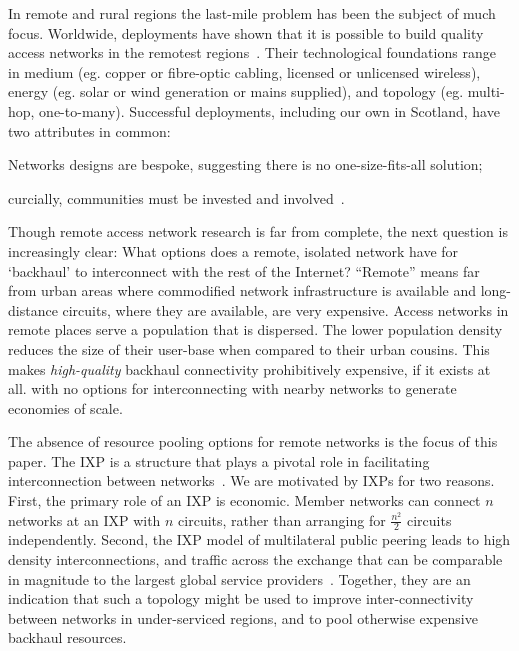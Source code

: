 In remote and rural regions the last-mile problem has been the subject of much
focus. Worldwide, deployments have shown that it is possible to build quality
access networks in the remotest regions~\cite{xxx}. Their technological
foundations range in medium (eg. copper or fibre-optic cabling, licensed
or unlicensed wireless), energy (eg. solar or wind generation or
mains supplied), and topology (eg. multi-hop,
one-to-many). Successful deployments, including our own in Scotland,
have two attributes in common:
\begin{inparaenum}[(i)]
  \item Networks designs are bespoke, suggesting
    there is no one-size-fits-all solution;
  \item curcially, communities must be invested and
  involved~\cite{Wallace:2015a,
    Wallace2015b}.
\end{inparaenum}

Though remote access network research is far from complete, the next question
is increasingly clear: What options does a remote, isolated network have for
`backhaul' to interconnect with the rest of the Internet? ``Remote'' means far
from urban areas where commodified network infrastructure is available and
long-distance circuits, where they are available, are very expensive. Access
networks in remote places serve a population that is dispersed. The lower
population density reduces the size of their user-base when compared to their
urban cousins. This makes \emph{high-quality} backhaul connectivity
prohibitively expensive, if it exists at all. with no options for
interconnecting with nearby networks to generate economies of scale.


The absence of resource pooling options for remote networks is the focus of this
paper. The \acf{IXP} is a structure that plays a pivotal role in facilitating
interconnection between networks~\cite{Ager::2012}. We are motivated by
\acp{IXP} for two reasons. First, the primary role of an \ac{IXP} is economic.
Member networks can connect $n$ networks at an IXP with $n$ circuits, rather
than arranging for $\frac{n^2}{2}$ circuits independently. Second, the \ac{IXP}
model of multilateral public peering leads to high density interconnections, and
traffic across the exchange that can be comparable in magnitude to the largest
global service providers~\cite{Ager:2012}. Together, they are an indication that
such a topology might be used to improve inter-connectivity between networks in
under-serviced regions, and to pool otherwise expensive backhaul resources.

